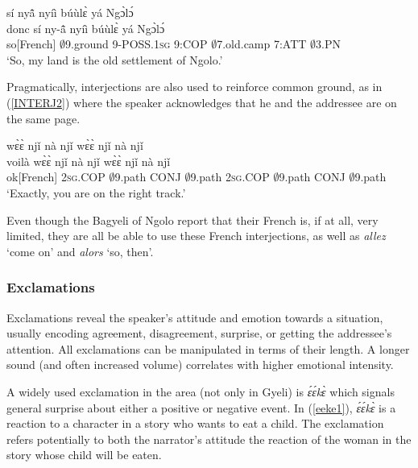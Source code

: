 \begin{exe} 
\ex\label{INTERJ1} 
   sí nyã̂ nyíì búùlɛ̀ yá Ngɔ̀lɔ́ \\
        donc sí ny-ã̂ nyíì búùlɛ̀ yá Ngɔ̀lɔ́ \\
        so[French] $\emptyset$9.ground 9-POSS.1\textsc{sg} 9:COP $\emptyset$7.old.camp 7:ATT $\emptyset$3.PN  \\
    \trans `So, my land is the old settlement of Ngolo.'
\end{exe}

Pragmatically, interjections are also used to reinforce common ground, as in (\ref{INTERJ2}) where the speaker acknowledges that he and the addressee are on the same page. 

\begin{exe} 
\ex\label{INTERJ2}
   wɛ̀ɛ̀ njǐ nà njǐ wɛ̀ɛ̀ njǐ nà njǐ\\
        voilà wɛ̀ɛ̀ njǐ nà njǐ wɛ̀ɛ̀ njǐ nà njǐ \\
          ok[French] 2\textsc{sg}.COP $\emptyset$9.path CONJ $\emptyset$9.path 2\textsc{sg}.COP $\emptyset$9.path CONJ $\emptyset$9.path  \\
    \trans `Exactly, you are on the right track.'
\end{exe}

Even though the Bagyeli of Ngolo report that their French is, if at all, very limited, they are all be able to use these French interjections, as well as {\itshape allez} `come on'  and {\itshape alors} `so, then'.

\subsubsection{Exclamations}
\label{sec:EXCL}

Exclamations reveal the speaker's attitude and emotion towards a situation, usually encoding agreement, disagreement, surprise, or getting the addressee's attention. All exclamations can be manipulated in terms of their length. A longer sound (and often increased volume) correlates with higher emotional intensity.

A widely used exclamation in the area (not only in Gyeli) is {\itshape  ɛ́ɛ́kɛ̀} which signals general surprise about either a positive or negative event. In (\ref{eeke1}), {\itshape ɛ́ɛ́kɛ̀} is a reaction to a character in a story who wants to eat a child. The exclamation refers potentially to both the narrator's attitude the reaction of the woman in the story whose child will be eaten.

